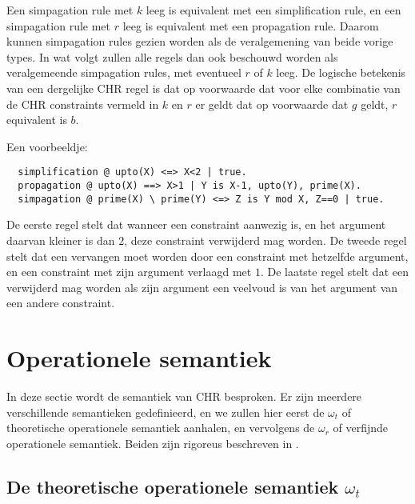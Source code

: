 Een simpagation rule met $k$ leeg is equivalent met een simplification rule, en een simpagation rule met $r$ leeg is equivalent met een propagation rule. Daarom kunnen simpagation rules gezien worden als de veralgemening van beide vorige types. In wat volgt zullen alle regels dan ook beschouwd worden als veralgemeende simpagation rules, met eventueel $r$ of $k$ leeg. De logische betekenis van een dergelijke CHR regel is dat op voorwaarde dat voor elke combinatie van de CHR constraints vermeld in $k$ en $r$ er geldt dat op voorwaarde dat $g$ geldt, $r$ equivalent is $b$.

Een voorbeeldje:
\begin{Verbatim}
  simplification @ upto(X) <=> X<2 | true.
  propagation @ upto(X) ==> X>1 | Y is X-1, upto(Y), prime(X).
  simpagation @ prime(X) \ prime(Y) <=> Z is Y mod X, Z==0 | true.
\end{Verbatim}

De eerste regel stelt dat wanneer een  constraint aanwezig is, en het argument daarvan kleiner is dan $2$, deze constraint verwijderd mag worden. De tweede regel stelt dat een  vervangen moet worden door een  constraint met hetzelfde argument, en een  constraint met zijn argument verlaagd met $1$. De laatste regel stelt dat een  verwijderd mag worden als zijn argument een veelvoud is van het argument van een andere  constraint.

\section{Operationele semantiek}

In deze sectie wordt de semantiek van CHR besproken. Er zijn meerdere verschillende semantieken gedefinieerd, en we zullen hier eerst de $\omega_t$ of theoretische operationele semantiek aanhalen, en vervolgens de $\omega_r$ of verfijnde operationele semantiek. Beiden zijn rigoreus beschreven in \cite{refined}.

\subsection{De theoretische operationele semantiek $\omega_t$}

